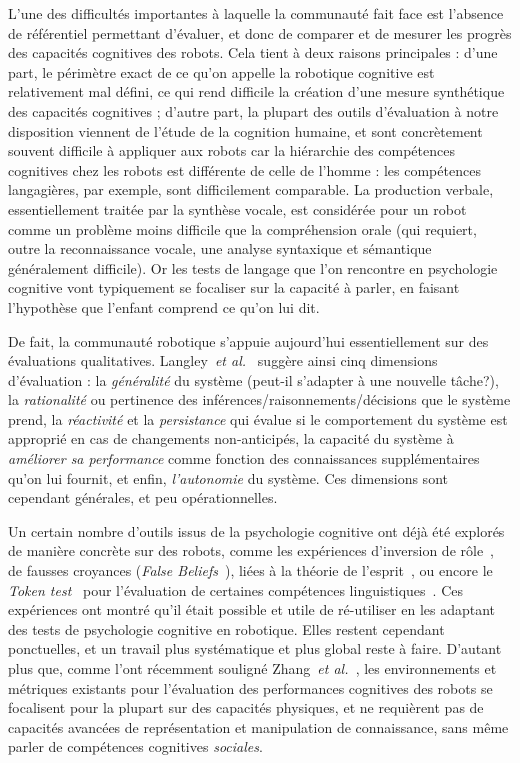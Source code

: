 \documentclass[a4paper]{article}
\newcommand{\etal}{{\textit{et al.~}}}
\begin{document}
L'une des difficultés importantes à laquelle la communauté fait face est
l'absence de référentiel permettant d'évaluer, et donc de comparer et de mesurer
les progrès des capacités cognitives des robots.  Cela tient à deux raisons
principales : d'une part, le périmètre exact de ce qu'on appelle la robotique
cognitive est relativement mal défini, ce qui rend difficile la création d'une
mesure synthétique des capacités cognitives ; d'autre part, la plupart des
outils d'évaluation à notre disposition viennent de l'étude de la cognition
humaine, et sont concrètement souvent difficile à appliquer aux robots car la
hiérarchie des compétences cognitives chez les robots est différente de celle de
l'homme : les compétences langagières, par exemple, sont difficilement
comparable. La production verbale, essentiellement traitée par la synthèse
vocale, est considérée pour un robot comme un problème moins difficile que la
compréhension orale (qui requiert, outre la reconnaissance vocale, une analyse
syntaxique et sémantique généralement difficile). Or les tests de langage que
l'on rencontre en psychologie cognitive vont typiquement se focaliser sur la
capacité à parler, en faisant l'hypothèse que l'enfant comprend ce qu'on lui dit.

De fait, la communauté robotique s'appuie aujourd'hui essentiellement sur des
évaluations qualitatives. Langley~\etal\cite{Langley2006} suggère ainsi cinq
dimensions d'évaluation : la \emph{généralité} du système (peut-il s'adapter à
une nouvelle tâche?), la \emph{rationalité} ou pertinence des
inférences/raisonnements/décisions que le système prend, la \emph{réactivité} et
la \emph{persistance} qui évalue si le comportement du système est approprié en
cas de changements non-anticipés, la capacité du système à \emph{améliorer sa
performance} comme fonction des connaissances supplémentaires qu'on lui fournit,
et enfin, \emph{l'autonomie} du système. Ces dimensions sont cependant
générales, et peu opérationnelles.

Un certain nombre d'outils issus de la psychologie cognitive ont déjà été
explorés de manière concrète sur des robots, comme les expériences d'inversion
de rôle~\cite{Lallee2010b}, de fausses croyances (\emph{False
Beliefs}~\cite{Leslie2000}), liées à la théorie de l'esprit~\cite{Breazeal2006,
warnier2012when, trafton2013act}, ou encore le \emph{Token
test}~\cite{DiSimoni1978} pour l'évaluation de certaines compétences
linguistiques~\cite{Mavridis2006}. Ces expériences ont montré qu'il était
possible et utile de ré-utiliser en les adaptant des tests de psychologie
cognitive en robotique. Elles restent cependant ponctuelles, et un travail plus
systématique et plus global reste à faire. D'autant plus que, comme l'ont
récemment souligné Zhang~\etal\cite{zhang2013evaluation}, les environnements et
métriques existants pour l'évaluation des performances cognitives des robots se
focalisent pour la plupart sur des capacités physiques, et ne requièrent pas de
capacités avancées de représentation et manipulation de connaissance, sans même
parler de compétences cognitives \emph{sociales}.
\end{document}
